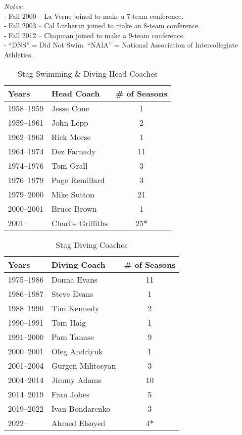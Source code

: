 \noindent\textit{Notes:} \\ 
- Fall 2000 – La Verne joined to make a 7-team conference. \\
- Fall 2003 – Cal Lutheran joined to make an 8-team conference. \\
- Fall 2012 – Chapman joined to make a 9-team conference. \\
- ``DNS'' = Did Not Swim. ``NAIA'' = National Association of Intercollegiate Athletics.

\clearpage

\begin{table}[htbp]
\centering
\caption*{Stag Swimming \& Diving Head Coaches}
\begin{tabular}{llc}
\toprule
Years & Head Coach & \# of Seasons \\
\midrule
1958--1959 & Jesse Cone & 1 \\
1959--1961 & John Lepp & 2 \\
1962--1963 & Rick Morse & 1 \\
1964--1974 & Dez Farnady & 11 \\
1974--1976 & Tom Grall & 3 \\
1976--1979 & Page Remillard & 3 \\
1979--2000 & Mike Sutton & 21 \\
2000--2001 & Bruce Brown & 1 \\
2001-- & Charlie Griffiths & 25* \\
\bottomrule
\end{tabular}
\end{table}


\begin{table}[htbp]
\centering
\caption*{Stag Diving Coaches}
\begin{tabular}{llc}
\toprule
Years & Diving Coach & \# of Seasons \\
\midrule
1975--1986 & Donna Evans & 11 \\
1986--1987 & Steve Evans & 1 \\
1988--1990 & Tim Kennedy & 2 \\
1990--1991 & Tom Haig & 1 \\
1991--2000 & Pam Tanase & 9 \\
2000--2001 & Oleg Andriyuk & 1 \\
2001--2004 & Gurgen Militosyan & 3 \\
2004--2014 & Jimmy Adams & 10 \\
2014--2019 & Fran Jobes & 5 \\
2019--2022 & Ivan Bondarenko & 3 \\
2022-- & Ahmed Elsayed & 4* \\
\bottomrule
\end{tabular}
\end{table}

